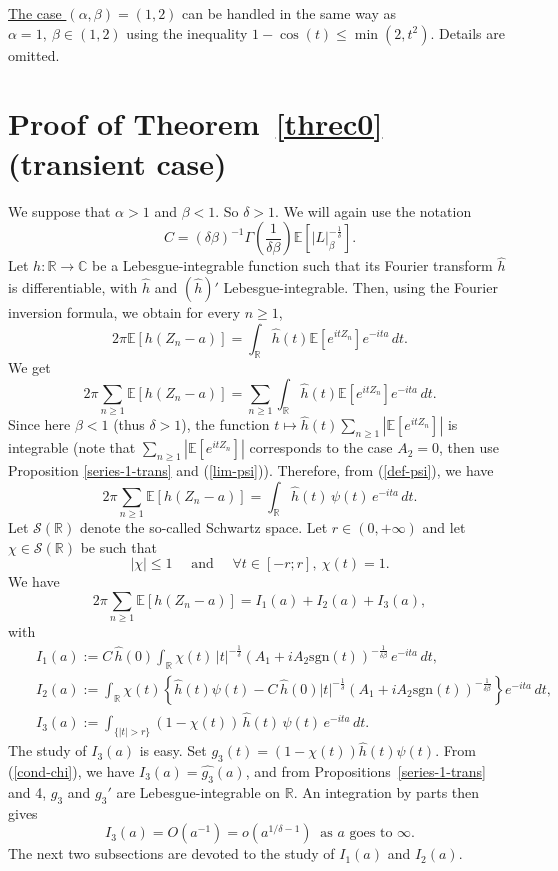 \documentclass[oneside, a4paper,11pt,reqno]{amsart}
\begin{document}
\noindent \underline{The case $(\alpha,\beta)=(1,2)$} can be handled in the same way as $\alpha=1, \ \beta\in(1,2)$ using the inequality 
$1-\cos(t)\leq \min (2, t^2 ).$ Details are omitted.

 
 

\section{Proof of Theorem~\ref{threc0} (transient case)}
We suppose that $\alpha>1$ and $\beta<1$. So $\delta>1$.
We will again use the notation 
$$C=(\delta \beta)^{-1} 
 \Gamma(\frac 1{\delta\beta}){\mathbb E}[|L|_\beta^{-\frac 1\delta}].$$
Let $h :{\mathbb R} \rightarrow {\mathbb C}$ be a Lebesgue-integrable function such that its Fourier transform 
$\hat h$ is differentiable, with $\hat h$ and $(\hat h)'$ Lebesgue-integrable. Then, using 
the Fourier inversion formula, we obtain for every $n\ge 1$,
$$2\pi{\mathbb E}[h(Z_n-a)] = 
   \int_{\mathbb R} \hat h(t){\mathbb E}[e^{itZ_n}]e^{-i ta}\, dt.$$
We get 
$$2\pi\sum_{n\ge 1}{\mathbb E}[h(Z_n-a)] = 
   \sum_{n\ge 1}\int_{\mathbb R} \hat h(t){\mathbb E}[e^{itZ_n}]  e^{-i ta}
  \, dt.$$
Since here $\beta<1$ (thus $\delta>1$), the function  $t\mapsto \hat{h}(t) \sum_{n\ge 1}\left| {\mathbb E} [e^{itZ_n}]\right|$ is integrable (note that $\sum_{n\ge 1}\left| {\mathbb E} [e^{itZ_n}]\right|$
corresponds to the case $A_2=0$, then use Proposition \ref{series-1-trans} and (\ref{lim-psi})). Therefore, from (\ref{def-psi}), we have
$$2\pi\sum_{n\ge 1}{\mathbb E}[h(Z_n-a)] = 
   \int_{\mathbb R} \hat h(t)\, \psi(t)\,  e^{-i ta}
  \, dt.$$
Let ${\mathcal S}({\mathbb R})$  denote the so-called Schwartz space. 
Let $r\in(0,+\infty)$ and let $\chi\in{\mathcal S}({\mathbb R})$ be such that 
\begin{equation}\label{cond-chi} 
|\chi|\leq 1\quad \text{ and } \quad \forall t\in[-r;r],\ \chi(t)=1.
\end{equation}
We have
$$2\pi\sum_{n\ge 1}{\mathbb E}[h(Z_n-a)] = I_1(a)+I_2(a)+I_3(a),$$
with
\begin{subequations}
\begin{eqnarray}
& & I_1(a):=   C\, \hat h(0) \int_{\mathbb R}\chi(t)\, |t|^{-\frac 1\delta}(A_1+iA_2\text{sgn}(t))^{-\frac1{\delta\beta}} \, e^{-i ta}
  \, dt,  \nonumber \\
& &  I_2(a):=   \int_{\mathbb R} \chi(t)\left\{\hat h(t)\psi(t) 
     - C\, \hat h(0) |t|^{-\frac 1\delta}(A_1+iA_2\text{sgn}(t))^{-\frac1{\delta\beta}} \right\} e^{-i ta}
  \, dt, \nonumber \\
& &  I_3(a):=   \int_{\{|t|>r\}}(1-\chi(t))\, \hat h(t)\, \psi(t)\, e^{-i ta}
  \, dt. \nonumber
\end{eqnarray}
\end{subequations}
The study of $I_3(a)$ is easy. Set $g_3(t) = (1-\chi(t))\hat h(t)\psi(t)$. 
From (\ref{cond-chi}), we have $I_3(a)= \widehat{g_3}(a)$, 
and from Propositions~\ref{series-1-trans} and 4, $g_3$ and $g_3'$ are Lebesgue-integrable on ${\mathbb R}$. An integration by parts then gives
$$I_3(a)=O(a^{-1}) = o(a^{1/\delta-1})\ \mbox{ as }a\mbox{ goes to }
\infty. $$
The next two subsections are devoted to the study of $I_1(a)$ and $I_2(a)$.  
\end{document}
